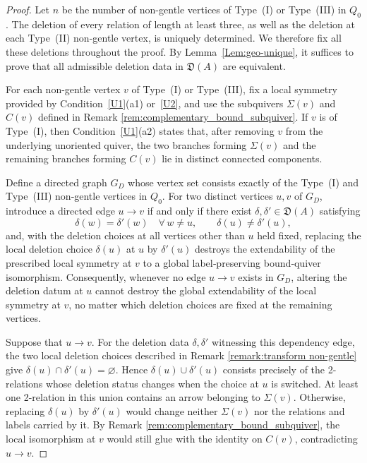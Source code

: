 \documentclass[11pt]{amsart}
\numberwithin{equation}{section}
\theoremstyle{definition}
\begin{document}
\begin{proof}
Let $n$ be the number of non-gentle vertices of
Type~\textup{(I)} or Type~\textup{(III)} in $Q_0$.
The deletion of every relation of length at least three,
as well as the deletion at each Type~\textup{(II)} non-gentle
vertex, is uniquely determined. We therefore fix all these
deletions throughout the proof. By
Lemma~\ref{Lem:geo-unique}, it suffices to prove that all
admissible deletion data in $\mathfrak D(A)$ are equivalent.

For each non-gentle vertex $v$ of Type~\textup{(I)} or
Type~\textup{(III)}, fix a local symmetry provided by
Condition~\ref{U1}\textup{(a1)} or~\ref{U2}, and use the
subquivers $\Sigma(v)$ and $C(v)$ defined in Remark \ref{rem:complementary_bound_subquiver}.
If $v$ is of Type~\textup{(I)}, then
Condition~\ref{U1}\textup{(a2)} states that, after removing $v$
from the underlying unoriented quiver, the two branches forming
$\Sigma(v)$ and the remaining branches forming $C(v)$ lie in
distinct connected components.

Define a directed graph $G_D$ whose vertex set consists exactly of the Type~\textup{(I)} and Type~\textup{(III)} non‑gentle vertices in $Q_0$. For two distinct vertices $u,v$ of $G_D$, introduce a directed edge $u\longrightarrow v$ if and only if there exist $\delta,\delta'\in\mathfrak{D}(A)$ satisfying
\[
\delta(w)=\delta'(w)\quad\forall\,w\neq u,\qquad \delta(u)\neq\delta'(u),
\]
and, with the deletion choices at all vertices other than $u$ held fixed, replacing the local deletion choice $\delta(u)$ at $u$ by $\delta'(u)$ destroys the extendability of the prescribed local symmetry at $v$ to a global label‑preserving bound‑quiver isomorphism. Consequently, whenever no edge $u\to v$ exists in $G_D$, altering the deletion datum at $u$ cannot destroy the global extendability of the local symmetry at $v$, no matter which deletion choices are fixed at the remaining vertices.

Suppose that $u\to v$. For the deletion data $\delta,\delta'$
witnessing this dependency edge, the two local deletion choices
described in Remark \ref{remark:transform non-gentle} give
$\delta(u)\cap\delta'(u)=\varnothing.$
Hence $\delta(u)\cup\delta'(u)$ consists precisely of the
2-relations whose deletion status changes when the choice
at $u$ is switched. At least one 2-relation in this union
contains an arrow belonging to $\Sigma(v)$. Otherwise, replacing
$\delta(u)$ by $\delta'(u)$ would change neither $\Sigma(v)$ nor
the relations and labels carried by it. By Remark \ref{rem:complementary_bound_subquiver},
the local isomorphism at $v$ would still glue with the identity on
$C(v)$, contradicting $u\to v$.


\end{proof}
\end{document}
